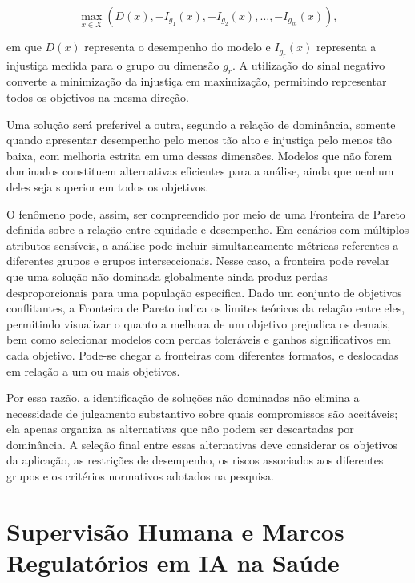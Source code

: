 \begin{equation}
    \max_{x \in X}
    \left(
        D(x),
        -I_{g_1}(x),
        -I_{g_2}(x),
        \ldots,
        -I_{g_m}(x)
    \right),
\end{equation}

em que $D(x)$ representa o desempenho do modelo e
$I_{g_r}(x)$ representa a injustiça medida para o grupo ou dimensão
$g_r$. A utilização do sinal negativo converte a minimização da
injustiça em maximização, permitindo representar todos os objetivos
na mesma direção.

Uma solução será preferível a outra, segundo a relação de dominância,
somente quando apresentar desempenho pelo menos tão alto e injustiça
pelo menos tão baixa, com melhoria estrita em uma dessas dimensões.
Modelos que não forem dominados constituem alternativas eficientes
para a análise, ainda que nenhum deles seja superior em todos os
objetivos.

O fenômeno pode, assim, ser compreendido por meio de uma Fronteira de
Pareto definida sobre a relação entre equidade e desempenho. Em cenários com múltiplos atributos sensíveis, a análise pode incluir simultaneamente métricas referentes a diferentes grupos e grupos interseccionais. Nesse caso, a fronteira pode revelar que uma solução não dominada globalmente
ainda produz perdas desproporcionais para uma população específica. Dado um conjunto de objetivos conflitantes, a Fronteira de Pareto indica os limites teóricos da relação entre eles, permitindo visualizar o quanto a melhora de um objetivo prejudica os demais, bem como selecionar modelos com perdas toleráveis e ganhos significativos em cada objetivo. Pode-se chegar a fronteiras com diferentes formatos, e deslocadas em relação a um ou mais objetivos.

Por essa razão, a identificação de soluções não dominadas não elimina
a necessidade de julgamento substantivo sobre quais compromissos são
aceitáveis; ela apenas organiza as alternativas que não podem ser
descartadas por dominância. A seleção final entre essas alternativas
deve considerar os objetivos da aplicação, as restrições de desempenho,
os riscos associados aos diferentes grupos e os critérios normativos
adotados na pesquisa.

\section{Supervisão Humana e Marcos Regulatórios em IA na Saúde}
\label{sec:supervisao_humana}

